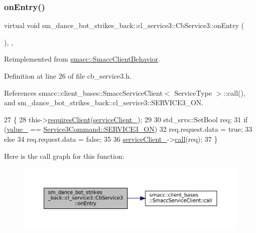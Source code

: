 \subsubsection{\texorpdfstring{on\+Entry()}{onEntry()}}
{\footnotesize\ttfamily virtual void sm\+\_\+dance\+\_\+bot\+\_\+strikes\+\_\+back\+::cl\+\_\+service3\+::\+Cb\+Service3\+::on\+Entry (\begin{DoxyParamCaption}{ }\end{DoxyParamCaption})\hspace{0.3cm}{\ttfamily [inline]}, {\ttfamily [override]}, {\ttfamily [virtual]}}



Reimplemented from \hyperlink{classsmacc_1_1SmaccClientBehavior_a7962382f93987c720ad432fef55b123f}{smacc\+::\+Smacc\+Client\+Behavior}.



Definition at line 26 of file cb\+\_\+service3.\+h.



References smacc\+::client\+\_\+bases\+::\+Smacc\+Service\+Client$<$ Service\+Type $>$\+::call(), and sm\+\_\+dance\+\_\+bot\+\_\+strikes\+\_\+back\+::cl\+\_\+service3\+::\+S\+E\+R\+V\+I\+C\+E3\+\_\+\+ON.


\begin{DoxyCode}
27   \{
28     this->\hyperlink{classsmacc_1_1SmaccClientBehavior_a917f001e763a1059af337bf4e164f542}{requiresClient}(\hyperlink{classsm__dance__bot__strikes__back_1_1cl__service3_1_1CbService3_ae96f1d34aa0ab6b9bc7099c5c0e512de}{serviceClient\_});
29 
30     std\_srvs::SetBool req;
31     \textcolor{keywordflow}{if} (\hyperlink{classsm__dance__bot__strikes__back_1_1cl__service3_1_1CbService3_a76973df60e0e3ed7d7c270d0701b8f9d}{value\_} == \hyperlink{namespacesm__dance__bot__strikes__back_1_1cl__service3_ac2ccf5d911840620cf8d0443c29d8b6ba13cdca48a01bbb44fa8fb35567fbc58e}{Service3Command::SERVICE3\_ON})
32       req.request.data = \textcolor{keyword}{true};
33     \textcolor{keywordflow}{else}
34       req.request.data = \textcolor{keyword}{false};
35 
36     \hyperlink{classsm__dance__bot__strikes__back_1_1cl__service3_1_1CbService3_ae96f1d34aa0ab6b9bc7099c5c0e512de}{serviceClient\_}->\hyperlink{classsmacc_1_1client__bases_1_1SmaccServiceClient_a0e9914f45f1091c38bb9ad6187d07977}{call}(req);
37   \}
\end{DoxyCode}
Here is the call graph for this function\+:
\nopagebreak
\begin{figure}[H]
\begin{center}
\leavevmode
\includegraphics[width=350pt]{classsm__dance__bot__strikes__back_1_1cl__service3_1_1CbService3_a09a2fda38973e1e3915b63a47ca67ed1_cgraph}
\end{center}
\end{figure}


